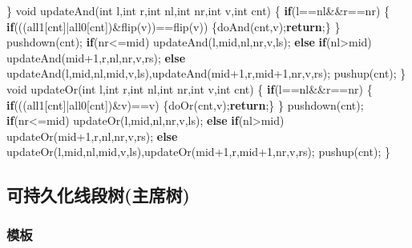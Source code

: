 \documentclass[
]{article}
\newenvironment{Shaded}{}{}
\newcommand{\ControlFlowTok}[1]{\textcolor[rgb]{0.00,0.44,0.13}{\textbf{#1}}}
\newcommand{\DataTypeTok}[1]{\textcolor[rgb]{0.56,0.13,0.00}{#1}}
\newcommand{\DecValTok}[1]{\textcolor[rgb]{0.25,0.63,0.44}{#1}}
\newcommand{\NormalTok}[1]{#1}
\begin{document}
\begin{Shaded}
\begin{Highlighting}[]
\NormalTok{\}}
\DataTypeTok{void}\NormalTok{ updateAnd(}\DataTypeTok{int}\NormalTok{ l,}\DataTypeTok{int}\NormalTok{ r,}\DataTypeTok{int}\NormalTok{ nl,}\DataTypeTok{int}\NormalTok{ nr,}\DataTypeTok{int}\NormalTok{ v,}\DataTypeTok{int}\NormalTok{ cnt)}
\NormalTok{\{}
    \ControlFlowTok{if}\NormalTok{(l==nl\&\&r==nr)}
\NormalTok{    \{}
        \ControlFlowTok{if}\NormalTok{(((all1[cnt]|all0[cnt])\&flip(v))==flip(v))}
\NormalTok{            \{doAnd(cnt,v);}\ControlFlowTok{return}\NormalTok{;\}}
\NormalTok{    \}}
\NormalTok{    pushdown(cnt);}
    \ControlFlowTok{if}\NormalTok{(nr\textless{}=mid) updateAnd(l,mid,nl,nr,v,ls);}
    \ControlFlowTok{else} \ControlFlowTok{if}\NormalTok{(nl\textgreater{}mid) updateAnd(mid+}\DecValTok{1}\NormalTok{,r,nl,nr,v,rs);}
    \ControlFlowTok{else}\NormalTok{ updateAnd(l,mid,nl,mid,v,ls),updateAnd(mid+}\DecValTok{1}\NormalTok{,r,mid+}\DecValTok{1}\NormalTok{,nr,v,rs);}
\NormalTok{    pushup(cnt);}
\NormalTok{\}}
\DataTypeTok{void}\NormalTok{ updateOr(}\DataTypeTok{int}\NormalTok{ l,}\DataTypeTok{int}\NormalTok{ r,}\DataTypeTok{int}\NormalTok{ nl,}\DataTypeTok{int}\NormalTok{ nr,}\DataTypeTok{int}\NormalTok{ v,}\DataTypeTok{int}\NormalTok{ cnt)}
\NormalTok{\{}
    \ControlFlowTok{if}\NormalTok{(l==nl\&\&r==nr)}
\NormalTok{    \{}
        \ControlFlowTok{if}\NormalTok{(((all1[cnt]|all0[cnt])\&v)==v)}
\NormalTok{            \{doOr(cnt,v);}\ControlFlowTok{return}\NormalTok{;\}}
\NormalTok{    \}}
\NormalTok{    pushdown(cnt);}
    \ControlFlowTok{if}\NormalTok{(nr\textless{}=mid) updateOr(l,mid,nl,nr,v,ls);}
    \ControlFlowTok{else} \ControlFlowTok{if}\NormalTok{(nl\textgreater{}mid) updateOr(mid+}\DecValTok{1}\NormalTok{,r,nl,nr,v,rs);}
    \ControlFlowTok{else}\NormalTok{ updateOr(l,mid,nl,mid,v,ls),updateOr(mid+}\DecValTok{1}\NormalTok{,r,mid+}\DecValTok{1}\NormalTok{,nr,v,rs);}
\NormalTok{    pushup(cnt);}
\NormalTok{\}}
\end{Highlighting}
\end{Shaded}

\hypertarget{ux53efux6301ux4e45ux5316ux7ebfux6bb5ux6811ux4e3bux5e2dux6811}{%
\subsection{可持久化线段树(主席树)}\label{ux53efux6301ux4e45ux5316ux7ebfux6bb5ux6811ux4e3bux5e2dux6811}}

\hypertarget{ux6a21ux677f-1}{%
\subsubsection{模板}\label{ux6a21ux677f-1}}
\end{document}
